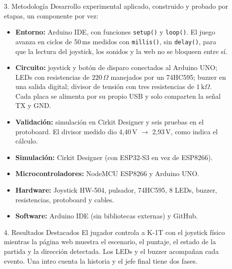 \documentclass[final]{beamer}
\newlength{\sepwidth}
\newlength{\colwidth}
\newcommand{\separatorcolumn}{\begin{column}{\sepwidth}\end{column}}
\begin{document}
\begin{frame}[t]
\begin{columns}[t]
\begin{column}{\colwidth}
\end{column}

\separatorcolumn

\begin{column}{\colwidth}

  \begin{block}{3. Metodología}
    Desarrollo experimental aplicado, construido y probado por etapas, un componente por vez:

    \begin{itemize}
      \item \textbf{Entorno:} Arduino IDE, con funciones \texttt{setup()} y \texttt{loop()}. El juego avanza en ciclos de 50\,ms medidos con \texttt{millis()}, sin \texttt{delay()}, para que la lectura del joystick, los sonidos y la web no se bloqueen entre sí.
      \item \textbf{Circuito:} joystick y botón de disparo conectados al Arduino UNO; LEDs con resistencias de $220\,\Omega$ manejados por un 74HC595; buzzer en una salida digital; divisor de tensión con tres resistencias de $1\,\text{k}\Omega$. Cada placa se alimenta por su propio USB y solo comparten la señal TX y GND.
      \item \textbf{Validación:} simulación en Cirkit Designer y seis pruebas en el protoboard. El divisor medido dio 4,40\,V $\to$ 2,93\,V, como indica el cálculo.
    \end{itemize}

    \begin{itemize}
      \item \textbf{Simulación:} Cirkit Designer (con ESP32-S3 en vez de ESP8266).
      \item \textbf{Microcontroladores:} NodeMCU ESP8266 y Arduino UNO.
      \item \textbf{Hardware:} Joystick HW-504, pulsador, 74HC595, 8 LEDs, buzzer, resistencias, protoboard y cables.
      \item \textbf{Software:} Arduino IDE (sin bibliotecas externas) y GitHub.
    \end{itemize}
  \end{block}

  \begin{block}{4. Resultados Destacados}
    El jugador controla a K-1T con el joystick físico mientras la página web muestra el escenario, el puntaje, el estado de la partida y la dirección detectada. Los LEDs y el buzzer acompañan cada evento. Una intro cuenta la historia y el jefe final tiene dos fases.


\end{block}
\end{column}
\end{columns}
\end{frame}
\end{document}
